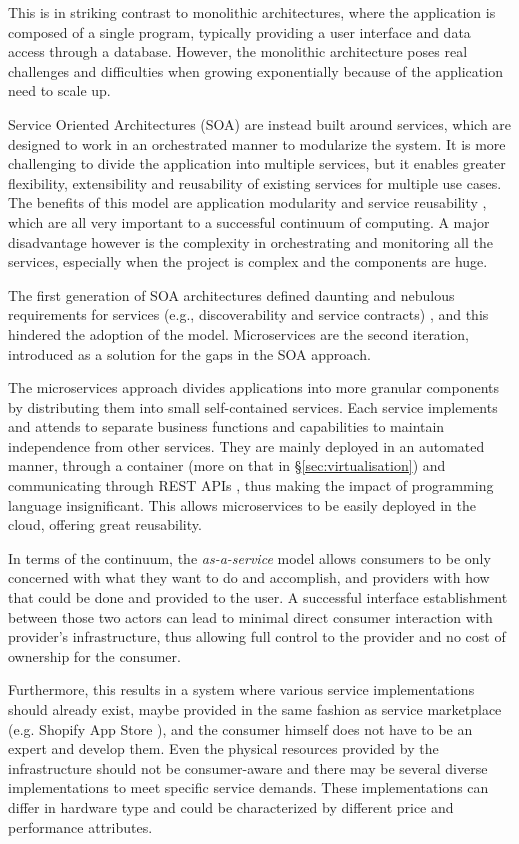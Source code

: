 \documentclass{ieeeaccess}
\begin{document}
This is in striking contrast to monolithic architectures, where the application is composed of a single program, typically providing a user interface and data access through a database. However, the monolithic architecture poses real challenges and difficulties when growing exponentially because of the application need to scale up.

Service Oriented Architectures (SOA) are instead built around services, which are designed to work in an orchestrated manner to modularize the system. It is more challenging to divide the application into multiple services, but it enables greater flexibility, extensibility and reusability of existing services for multiple use cases. The benefits of this model are application modularity and service reusability \cite{cloud-to-thing}, which are all very important to a successful continuum of computing. A major disadvantage however is the complexity in orchestrating and monitoring all the services, especially when the project is complex and the components are huge.

The first generation of SOA architectures defined daunting and nebulous requirements for services (e.g., discoverability and service contracts) \cite{microservices-today}, and this hindered the adoption of the model. Microservices are the second iteration, introduced as a solution for the gaps in the SOA approach.

The microservices approach divides applications into more granular components by distributing them into small self-contained services. Each service implements and attends to separate business functions and capabilities to maintain independence from other services. They are mainly deployed in an automated manner, through a container (more on that in §\ref{sec:virtualisation}) and communicating through REST APIs \cite{rest}, thus making the impact of programming language insignificant. This allows microservices to be easily deployed in the cloud, offering great reusability.

In terms of the continuum, the \emph{as-a-service} model allows consumers to be only concerned with what they want to do and accomplish, and providers with how that could be done and provided to the user. A successful interface establishment between those two actors can lead to minimal direct consumer interaction with provider’s infrastructure, thus allowing full control to the provider and no cost of ownership for the consumer.

Furthermore, this results in a system where various service implementations should already exist, maybe provided in the same fashion as service marketplace (e.g. Shopify App Store \cite{shopify}), and the consumer himself does not have to be an expert and develop them. Even the physical resources provided by the infrastructure should not be consumer-aware and there may be several diverse implementations to meet specific service demands. These implementations can differ in hardware type and could be characterized by different price and performance attributes.
\end{document}
